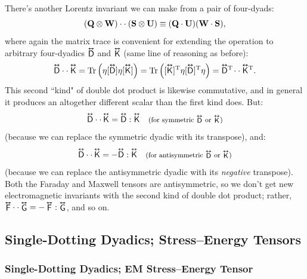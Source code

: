 \documentclass[12pt]{article}
\renewcommand{\vv}[1]{\mathbf{#1}}
\newcommand{\tightoverset}[2]{%
  \mathop{#2}\limits^{\vbox to -.5ex{\kern-0.75ex\hbox{$#1$}\vss}}}
\newcommand{\inlinedy}[1]{\tightoverset{\text{\tiny$\bm\leftrightarrow$}}{#1}}
\newcommand{\fnoverset}[2]{%
  \mathop{#2}\limits^{\vbox to -.5ex{\kern-0.85ex\hbox{$#1$}\vss}}}
\newcommand{\footnotedy}[1]{\fnoverset{\text{\tiny$\bm\leftrightarrow$}}{#1}}
\newcommand{\capdy}[1]{ \overset{ \text{\tiny$\bm\leftrightarrow$} }{\vphantom{\text{\small{A}}}\smash{#1}} }
\begin{document}
There's another Lorentz invariant we can make from a pair of four-dyads:
\begin{equation}\label{eq:ddp2}
(\vv Q \otimes \vv W) \cdot \cdot \, \mkern1mu (\vv S \otimes \vv U) \equiv (\vv Q \cdot \vv U) (\vv W \cdot \vv S) ,
\end{equation}
where again the matrix trace is convenient for extending the operation to arbitrary four-dyadics $\inlinedy{\mathsf{D}}$ and $\inlinedy{\mathsf{K}}$ (same line of reasoning as before):
\begin{equation}\label{eq:ddp2trans}
\capdy{\mathsf{D}} \cdot \cdot \, \mkern1mu \capdy{\mathsf{K}} = \mathrm{Tr} \left( \eta [\capdy{\mathsf{D}}] \eta [ \capdy{\mathsf{K}} ] \right) = \mathrm{Tr} \left( [ \capdy{\mathsf{K}} ]^\mathrm{T} \eta [\capdy{\mathsf{D}}]^\mathrm{T} \eta \right) = \capdy{\mathsf{D}} \mkern0mu ^\mathrm{T} \mkern-2mu \cdot \cdot \, \mkern1mu \capdy{\mathsf{K}} \mkern0mu ^\mathrm{T} .
\end{equation}
This second ``kind" of double dot product is likewise commutative, and in general it produces an altogether different scalar than the first kind does. But:
\begin{equation}\label{eq:ddpsym}
\capdy{\mathsf{D}}  \cdot \cdot \, \capdy{\mathsf{K}} = \capdy{\mathsf{D}} : \capdy{\mathsf{K}} \quad \text{\footnotesize{(for symmetric $\footnotedy{\mathsf{D}}$ or $\footnotedy{\mathsf{K}}$)}}
\end{equation}
(because we can replace the symmetric dyadic with its transpose), and:
\begin{equation}\label{eq:ddpantisym}
\capdy{\mathsf{D}}  \cdot \cdot \, \capdy{\mathsf{K}} = - \capdy{\mathsf{D}} : \capdy{\mathsf{K}} \quad \text{\footnotesize{(for antisymmetric $\footnotedy{\mathsf{D}}$ or $\footnotedy{\mathsf{K}}$)}}
\end{equation}
(because we can replace the antisymmetric dyadic with its \emph{negative} transpose). Both the Faraday and Maxwell tensors are antisymmetric, so we don't get new electromagnetic invariants with the second kind of double dot product; rather, ${\inlinedy{\mathsf{F}}  \cdot \cdot \inlinedy{\mathsf{G}} = - \inlinedy{\mathsf{F}} : \inlinedy{\mathsf{G}}}$, and so on. 

\subsection{Single-Dotting Dyadics; Stress--Energy Tensors}

\subsubsection{Single-Dotting Dyadics; EM Stress--Energy Tensor}\label{sssec:sdfd}
\end{document}
